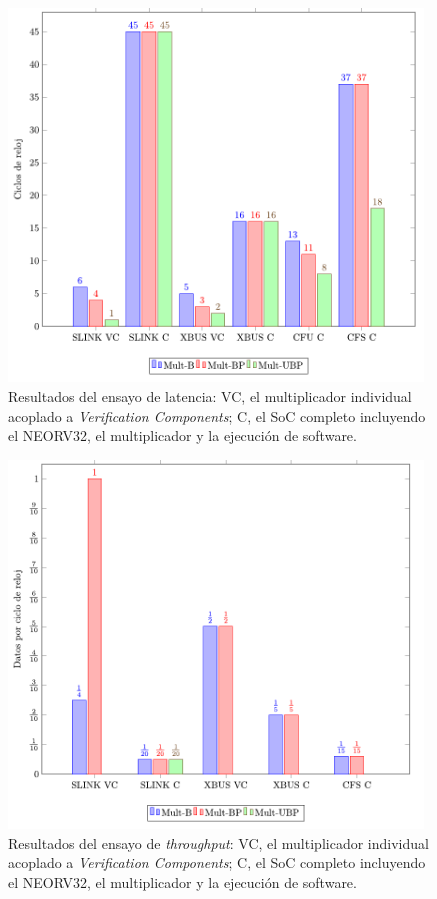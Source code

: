 \begin{figure}[H]
    \centering
    \includegraphics[width=11cm]{Figuras/Graf_Bar_LAT.pdf}
    \caption{Resultados del ensayo de latencia: VC, el multiplicador individual acoplado a \textit{Verification Components}; C, el SoC completo incluyendo el NEORV32, el multiplicador y la ejecución de software.}
    \label{fig:graf-lat}
\end{figure}

\begin{figure}[H]
    \centering
    \includegraphics[width=11cm]{Figuras/Graf_Bar_THR.pdf}
    \caption{Resultados del ensayo de \textit{throughput}: VC, el multiplicador individual acoplado a \textit{Verification Components}; C, el SoC completo incluyendo el NEORV32, el multiplicador y la ejecución de software.}
    \label{fig:graf-thr}
\end{figure}

